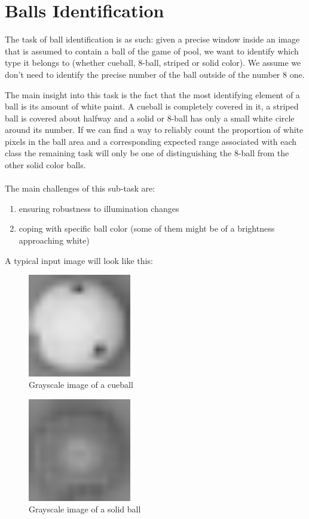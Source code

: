 \section{Balls Identification}

The task of ball identification is as such: 
given a precise window inside an image that is assumed to 
contain a ball of the game of pool, we want to identify 
which type it belongs to (whether cueball, 8-ball, striped or 
solid color). We assume we don't need to identify the precise 
number of the ball outside of the number 8 one.

The main insight into this task is the fact that the most 
identifying element of a ball is its amount of white paint. 
A cueball is completely covered in it, a striped ball is 
covered about halfway and a solid or 8-ball has only a small 
white circle around its number. If we can find a way to 
reliably count the proportion of white pixels in the ball area 
and a corresponding expected range associated with each class 
the remaining task will only be one of distinguishing the 
8-ball from the other solid color balls.
\\ \\
The main challenges of this sub-task are:
\begin{enumerate}
  \item ensuring robustness to illumination changes
  \item coping with specific ball color 
  (some of them might be of a brightness approaching white)
\end{enumerate}

\noindent
A typical input image will look like this:
\begin{figure}[h]
  \centering
  \includegraphics[width=0.4\textwidth]{./imgs/cueball_grey.png}
  \caption{Grayscale image of a cueball}
\end{figure}

\begin{figure}[h]
  \centering
  \includegraphics[width=0.4\textwidth]{./imgs/difficult_solid.png}
  \caption{Grayscale image of a solid ball}
\end{figure}

